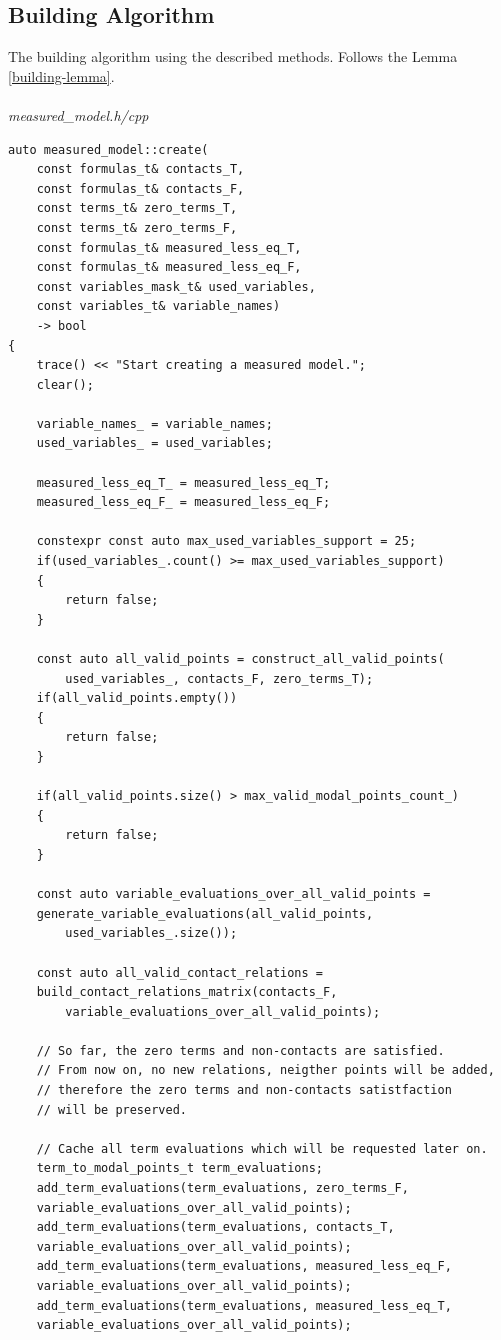 \documentclass{article}
\begin{document}
	\subsection{Building Algorithm}
		The building algorithm using the described methods. Follows the Lemma \ref{building-lemma}.
\\
\\
\noindent
\textit{measured\_model.h/cpp}
\begin{lstlisting}
auto measured_model::create(
    const formulas_t& contacts_T,
    const formulas_t& contacts_F,
    const terms_t& zero_terms_T,
    const terms_t& zero_terms_F,
    const formulas_t& measured_less_eq_T,
    const formulas_t& measured_less_eq_F,
    const variables_mask_t& used_variables,
    const variables_t& variable_names)
    -> bool 
{
    trace() << "Start creating a measured model.";
    clear();

    variable_names_ = variable_names;
    used_variables_ = used_variables;

    measured_less_eq_T_ = measured_less_eq_T;
    measured_less_eq_F_ = measured_less_eq_F;

    constexpr const auto max_used_variables_support = 25;
    if(used_variables_.count() >= max_used_variables_support)
    {
        return false;
    }

    const auto all_valid_points = construct_all_valid_points(
		used_variables_, contacts_F, zero_terms_T);
    if(all_valid_points.empty())
    {
        return false;
    }

    if(all_valid_points.size() > max_valid_modal_points_count_)
    {
        return false;
    }

    const auto variable_evaluations_over_all_valid_points = 
	generate_variable_evaluations(all_valid_points,
		used_variables_.size());

    const auto all_valid_contact_relations =
	build_contact_relations_matrix(contacts_F, 
		variable_evaluations_over_all_valid_points);

    // So far, the zero terms and non-contacts are satisfied.
    // From now on, no new relations, neigther points will be added, 
    // therefore the zero terms and non-contacts satistfaction 
    // will be preserved.

    // Cache all term evaluations which will be requested later on.
    term_to_modal_points_t term_evaluations;
    add_term_evaluations(term_evaluations, zero_terms_F,
	variable_evaluations_over_all_valid_points);
    add_term_evaluations(term_evaluations, contacts_T,
	variable_evaluations_over_all_valid_points);
    add_term_evaluations(term_evaluations, measured_less_eq_F, 
	variable_evaluations_over_all_valid_points);
    add_term_evaluations(term_evaluations, measured_less_eq_T, 
	variable_evaluations_over_all_valid_points);


\end{lstlisting}
\end{document}
